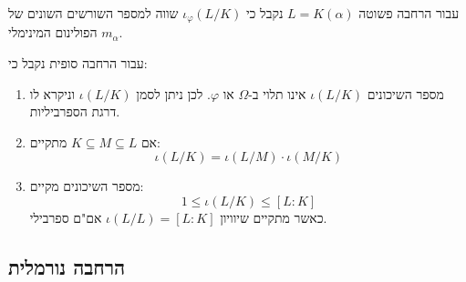 \documentclass{tstextbook}
\begin{document}
\begin{proposition}
עבור הרחבה פשוטה \(L=K\left( \alpha \right)\) נקבל כי \(\iota_{\varphi}(L / K)\) שווה למספר השורשים השונים של הפולינום המינימלי \(m_{\alpha}\).

\end{proposition}
\begin{proposition}
עבור הרחבה סופית נקבל כי:

  \begin{enumerate}
    \item מספר השיכונים \(\iota(L / K)\) אינו תלוי ב-\(\Omega\) או \(\varphi\). לכן ניתן לסמן \(\iota(L / K)\) וניקרא לו דרגת הספרביליות. 


    \item אם \(K\subseteq M\subseteq L\) מתקיים: 
$$\iota(L / K)=\iota(L / M) \cdot \iota(M / K)$$


    \item מספר השיכונים מקיים: 
$$1\leq \iota(L / K)\leq [L:K]$$
כאשר מתקיים שיוויון \(\iota(L / L)=[L:K]\) אם"ם ספרבילי.


  \end{enumerate}
\end{proposition}
\subsection{הרחבה נורמלית}
\end{document}
